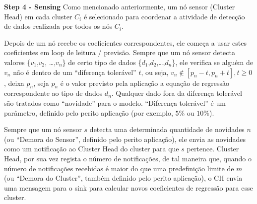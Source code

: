 \documentclass{acm_proc_article-sp}
\begin{document}
{\bf Step 4 - Sensing}
Como mencionado anteriormente, um nó sensor (Cluster Head) em cada cluster
$C_{i}$ é selecionado para coordenar a atividade de detecção de
dados realizada por todos os nós $C_ {i}$.
\vspace*{-.3cm}

Depois de um nó recebe os coeficientes correspondentes, ele começa a usar 
estes coeficientes em loop de leitura / previsão. 
Sempre que um nó sensor detecta valores \{$v_{1}$,$v_{2}$, \ldots,$v_{n}$\} de 
certo tipo de dados \{$d_{1}$,$d_{2}$,\ldots,$d_{n}$\}, ele verifica se 
alguém de $v_{n}$ não é dentro de um ``diferença tolerável'' $t$, ou seja,
$v_{n} \not \in [p_{n}-t,p_{n}+t], t \geq 0$, deixa $p_{n}$, seja $p_{n}$ 
é o valor previsto pela aplicação a equação de regressão correspondente
ao tipo de dados $d_{n}$. Qualquer dado fora da diferença tolerável são 
tratados como ``novidade'' para o modelo. ``Diferença tolerável'' é um
parâmetro, definido pelo perito aplicação (por exemplo, $5\%$ ou $10\%$).
\vspace*{-.3cm}

Sempre que um nó sensor $s$ detecta uma determinada quantidade de
novidades $n$ (ou ``Demora do Sensor'', definido pelo perito aplicação),
ele envia as novidades como um notificação ao Cluster Head do cluster
para que $s$ pertence. Cluster Head, por sua vez regista o número de 
notificações, de tal maneira que, quando o número de notificações recebidas
é maior do que uma predefinição limite de $m$ (ou ``Demora do Cluster'',
também definido pelo perito aplicação), o CH envia uma mensagem para o sink
para calcular novos coeficientes de regressão para esse cluster.
\vspace*{-.3cm}
\end{document}
